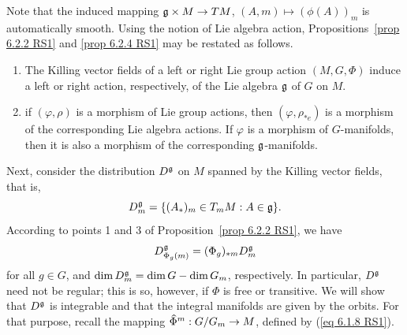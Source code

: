 Note that the induced mapping $\mathfrak{g}\times M\to TM$, $(A,m)\mapsto (\phi(A))_m$ is automatically smooth. Using the notion of Lie algebra action, Propositions~\ref{prop 6.2.2 RS1} and \ref{prop 6.2.4 RS1} may be restated as follows.

\begin{cor}
    \begin{enumerate}
        \item The Killing vector fields of a left or right Lie group action $(M,G,\Phi)$ induce a left or right action, respectively, of the Lie algebra $\mathfrak{g}$ of $G$ on $M$.
        \item if $(\varphi,\rho)$ is a morphism of Lie group actions, then $(\varphi,\rho_{\ast e})$ is a morphism of the corresponding Lie algebra actions. If $\varphi$ is a morphism of $G$-manifolds, then it is also a morphism of the corresponding $\mathfrak{g}$-manifolds.
    \end{enumerate}
\end{cor}

Next, consider the distribution $D^{\mathfrak{g}}$ on $M$ spanned by the Killing vector fields, that is,
\[D^{\mathfrak{g}}_m=\{(A_\ast)_m\in T_m M:A\in \mathfrak{g}\}.\]
According to points 1 and 3 of Proposition~\ref{prop 6.2.2 RS1}, we have
\[D^{\mathfrak{g}}_{\Phi_g(m)}=(\Phi_g)_{\ast m}D^{\mathfrak{g}}_m\label{eq 6.2.4 RS1}\]
for all $g\in G$, and $\dim D_m^{\mathfrak{g}}=\dim G-\dim G_m$, respectively. In particular, $D^{\mathfrak{g}}$ need not be regular; this is so, however, if $\Phi$ is free or transitive. We will show that $D^{\mathfrak{g}}$ is integrable and that the integral manifolds are given by the orbits. For that purpose, recall the mapping $\wh{\Phi}^m:G\slash G_m\to M$, defined by (\ref{eq 6.1.8 RS1}).

